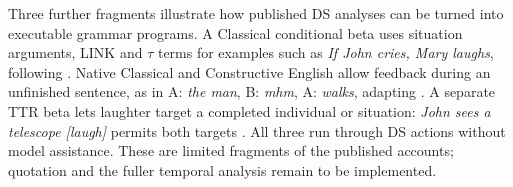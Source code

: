 Three further fragments illustrate how published DS analyses can be turned
into executable grammar programs. A Classical conditional beta uses situation
arguments, LINK and $\tau$ terms for examples such as \emph{If John cries,
Mary laughs}, following \citet{G11}. Native Classical and Constructive English
allow feedback during an unfinished sentence, as in A: \emph{the man},
B: \emph{mhm}, A: \emph{walks}, adapting \citet{HE21}. A separate TTR beta
lets laughter target a completed individual or situation: \emph{John sees a
telescope [laugh]} permits both targets \citep{MEMH26}. All three run through
DS actions without model assistance. These are limited fragments of the
published accounts; quotation and the fuller temporal analysis remain to be
implemented.
